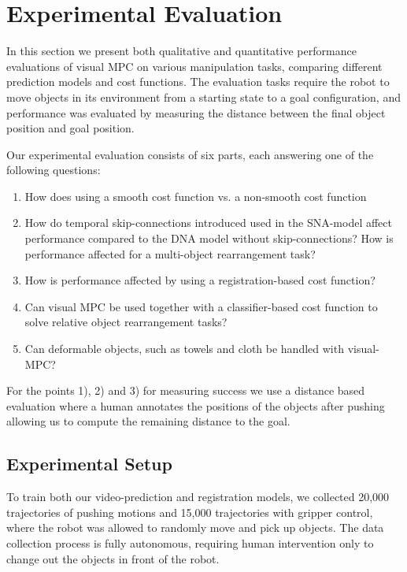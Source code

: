 \section{Experimental Evaluation}
\label{sec:experiments}
In this section we present both qualitative and quantitative  performance evaluations of visual MPC on various manipulation tasks, comparing different prediction models and cost functions.
The evaluation tasks require the robot to move objects in its environment from a starting state to a goal configuration, and performance was evaluated by measuring the distance between the final object position and goal position. 

Our experimental evaluation consists of six parts, each answering one of the following questions:
\begin{enumerate}
	\item How does using a smooth cost function vs. a non-smooth cost function
	\item How do temporal skip-connections introduced used in the SNA-model affect performance compared to the DNA model without skip-connections? How is performance affected for a multi-object rearrangement task?
	\item How is performance affected by using a registration-based cost function?
	\item Can visual MPC be used together with a classifier-based cost function to solve relative object rearrangement tasks?
	\item Can deformable objects, such as towels and cloth be handled with visual-MPC? 
\end{enumerate}

For the points 1), 2) and 3) for measuring success we use a distance based evaluation where a human annotates the positions of the objects after pushing allowing us to compute the remaining distance to the goal. 


\subsection{Experimental Setup}
To train both our video-prediction and registration models, we collected 20,000 trajectories of pushing motions and 15,000 trajectories with gripper control, where the robot was allowed to randomly move and pick up objects. The data collection process is fully autonomous, requiring human intervention only to change out the objects in front of the robot.

